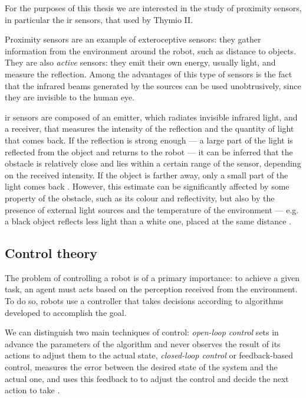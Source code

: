 For the purposes of this thesis we are interested in the study of proximity sensors, 
in particular the \gls{ir} sensors, that used by Thymio II.

Proximity sensors are an example of exteroceptive sensors: they gather 
information from the environment around the robot, such as distance to objects. 
They are 
also \emph{active} sensors: they emit their own energy, usually light, and measure 
the reflection. 
Among the advantages of this type of sensors is the fact that the infrared 
beams generated by the sources can be used unobtrusively, since they are 
invisible to the human eye.

\gls{ir} sensors are composed of an emitter, which radiates invisible infrared light, 
and a receiver, that measures the intensity of the reflection and the quantity of 
light that comes back.
If the reflection is strong enough — a large part of the light is reflected from 
the object and returns to the robot — it can be inferred that the obstacle is 
relatively close and lies within a certain range of the sensor, depending on 
the received intensity. If the object is farther away, only a small 
part of the light comes back \cite[][]{fu1987robotics}.
However, this estimate can be significantly affected by some property of the 
obstacle, such as its colour and reflectivity, but also by the presence of external 
light sources and the temperature of the environment — e.g. a black object 
reflects less light than a white one, placed at the same distance 
\cite[][]{mordechai2018elements}.

\subsection{Control theory}
\label{subsec:control}
The problem of controlling a robot is of a primary importance: to achieve a given 
task, an agent must acts based on the perception received from the environment. 
To do so, robots use a controller that takes decisions according to algorithms 
developed to accomplish the goal.

We can distinguish two main techniques of control: \emph{open-loop control} 
sets in advance the parameters of the algorithm and never observes the result of 
its actions to adjust them to the actual state, \emph{closed-loop control} or 
feedback-based control, measures the error between the desired state of the 
system and the actual one, and uses this feedback to to adjust the control and 
decide the next action to take \cite[][]{mordechai2018elements}.

